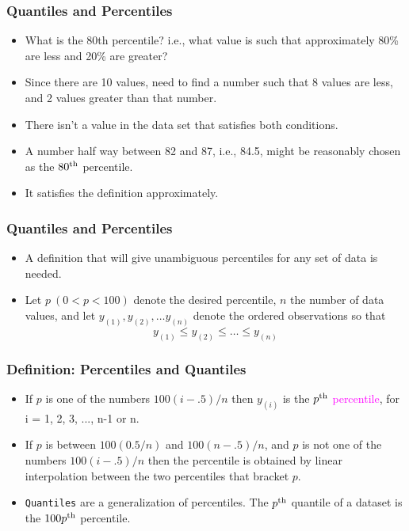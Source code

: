 \documentclass[xcolor=dvipsnames,12pt]{beamer}
\begin{document}
\begin{frame}
\frametitle{Quantiles and Percentiles}
\begin{itemize}
\item  What is the 80th percentile?  i.e., what value is such that
approximately 80\% are less and 20\% are greater? 
\item Since there are
10 values, need to find a number such that 8 values are less, 
and 2 values greater than that number.  
\item There isn't a value in the data set that satisfies both conditions. 
\item A number half way between 
82 and 87, i.e., 84.5, might be reasonably chosen as the $80^{\rm th}$
percentile.  
\item It satisfies the definition approximately.
\end{itemize}
\end{frame}

\begin{frame}
\frametitle{Quantiles and Percentiles}
\begin{itemize}
\item A definition that will give  unambiguous percentiles for any 
set of data is needed.  

\item Let $ p\ (0 < p < 100)$ denote the desired percentile,
$n$ the number of data values, and let $y_{(1)}, y_{(2)}, \ldots y_{(n)}$
denote the ordered observations so that
$$ y_{(1)} \le y_{(2)} \le \ldots  \le y_{(n)}$$
\end{itemize}
\end{frame}



\begin{frame}
\frametitle{Definition: Percentiles and Quantiles}
\begin{itemize}
\item If $p$ is one of the numbers $100(i-.5)/n$ then $y_{(i)}$ is the 
$p^{\rm th}$ \textcolor{magenta}{percentile}, for i = 1, 2, 3, ..., n-1 or n.
\item If $p$ is between $100(0.5/n)$ and $100(n-.5)/n$, and $p$ is not
one of the numbers $100(i-.5)/n$ then the percentile is obtained 
by linear interpolation between the two percentiles that bracket $p$.
\item {\tt Quantiles} are a generalization of percentiles. The 
$p^{\rm th}$ quantile of a dataset is the $100p^{\rm th}$
percentile. 
\end{itemize}
\end{frame}
\end{document}
